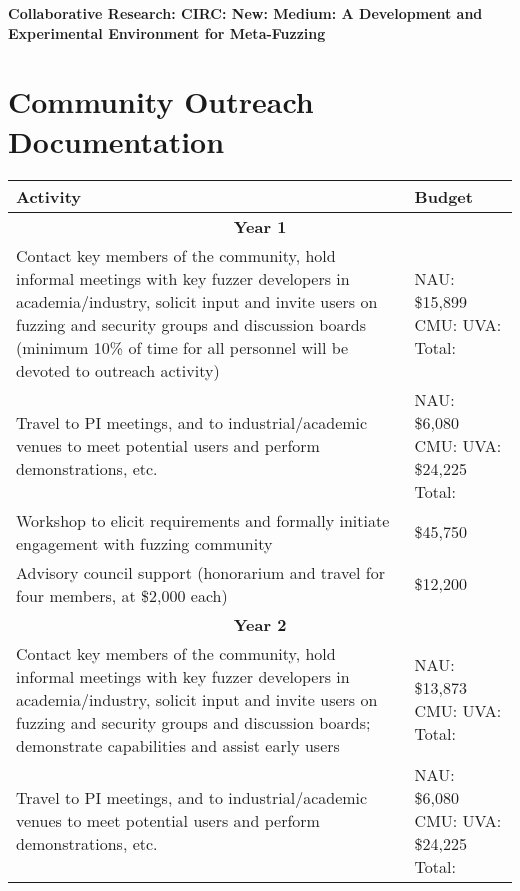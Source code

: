 \documentclass[12pt]{article}
\begin{document}
\begin{center} {\Large\sf\textbf{Collaborative Research: CIRC: New: Medium: A
      Development and Experimental Environment for Meta-Fuzzing}}
\end{center}

\section*{Community Outreach Documentation}


\begin{table}
  \begin{tabular}{|p{12cm}|p{3cm}|}
    \hline
    {\bf Activity} & {\bf Budget} \\
    \hline 
    \multicolumn{2}{c}{{\bf Year 1}} \\
    \hline
    Contact key members of the community, hold informal meetings with
    key fuzzer developers in academia/industry, solicit input and
    invite users
    on fuzzing and security groups and discussion boards (minimum 10\% of time for all
    personnel will be devoted to outreach activity) &  NAU: \$15,899 CMU: UVA:
                                                      Total:  \\
    \hline
    Travel to PI meetings, and to industrial/academic venues to meet
    potential users and perform demonstrations, etc. & NAU: \$6,080
                                                       CMU: UVA:
                                                       \$24,225 Total:\\
    \hline
    Workshop to elicit requirements and formally initiate engagement
    with fuzzing community & \$45,750 \\
    \hline 
    Advisory council support (honorarium and travel for four members, 
    at \$2,000 each) & \$12,200 \\
    \hline
    \hline
    \multicolumn{2}{c}{{\bf Year 2}} \\
    \hline
    \hline
    Contact key members of the community, hold informal meetings with
    key fuzzer developers in academia/industry, solicit input and
    invite users
    on fuzzing and security groups and discussion boards; demonstrate
    capabilities and assist early users&  NAU:  \$13,873 CMU: UVA:
                                                      Total:  \\
    \hline
    Travel to PI meetings, and to industrial/academic venues to meet
    potential users and perform demonstrations, etc. & NAU: \$6,080 CMU: UVA:  \$24,225 Total:\\

\end{tabular}
\end{table}
\end{document}
